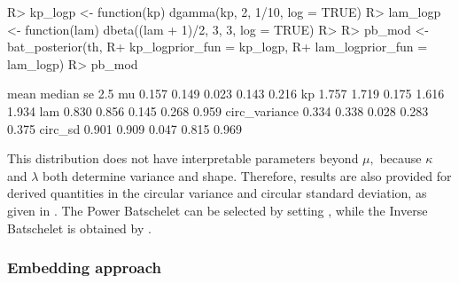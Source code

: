 \begin{CodeChunk}

\begin{CodeInput}
R> kp_logp  <- function(kp) dgamma(kp, 2, 1/10, log = TRUE)
R> lam_logp <- function(lam) dbeta((lam + 1)/2, 3, 3, log = TRUE)
R> 
R> pb_mod <- bat_posterior(th, 
R+                         kp_logprior_fun  = kp_logp,
R+                         lam_logprior_fun = lam_logp)
R> pb_mod
\end{CodeInput}

\begin{CodeOutput}
               mean median    se  2.5%
mu            0.157  0.149 0.023 0.143 0.216
kp            1.757  1.719 0.175 1.616 1.934
lam           0.830  0.856 0.145 0.268 0.959
circ_variance 0.334  0.338 0.028 0.283 0.375
circ_sd       0.901  0.909 0.047 0.815 0.969
\end{CodeOutput}
\end{CodeChunk}

This distribution does not have interpretable parameters beyond \(\mu,\)
because \(\kappa\) and \(\lambda\) both determine variance and shape.
Therefore, results are also provided for derived quantities in the
circular variance and circular standard deviation, as given in
\citep{fisher1995statistical}. The Power Batschelet can be selected by
setting , while the Inverse Batschelet is
obtained by .

\hypertarget{embedding-approach}{%
\subsubsection{Embedding approach}\label{embedding-approach}}

\label{sec:embed}

